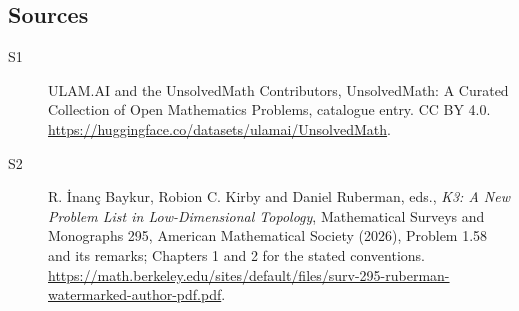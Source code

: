 \documentclass[11pt]{article}
\begin{document}
\subsection{Sources}
\begin{description}
\item[\hypertarget{source:statement:1}{S1}] ULAM.AI and the UnsolvedMath Contributors, UnsolvedMath: A Curated Collection of Open Mathematics Problems, catalogue entry. CC BY 4.0. \url{https://huggingface.co/datasets/ulamai/UnsolvedMath}.
\item[\hypertarget{source:statement:2}{S2}] R. İnanç Baykur, Robion C. Kirby and Daniel Ruberman, eds., \emph{K3: A New Problem List in Low-Dimensional Topology}, Mathematical Surveys and Monographs 295, American Mathematical Society (2026), Problem 1.58 and its remarks; Chapters 1 and 2 for the stated conventions. \url{https://math.berkeley.edu/sites/default/files/surv-295-ruberman-watermarked-author-pdf.pdf}.
\end{description}
\label{end:statement}
\end{document}
